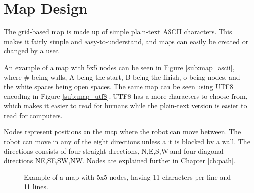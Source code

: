 \newpage

\section{Map Design}
\label{sec:map_design} %
The grid-based map is made up of simple plain-text ASCII characters.
This makes it fairly simple and easy-to-understand, and maps can easily be created or changed by a user. 

An example of a map with 5x5 nodes can be seen in Figure \ref{sub:map_ascii}, where \# being walls, A being the start, B being the finish, o being nodes, and the white spaces being open spaces. The same map can be seen using UTF8 encoding in Figure \ref{sub:map_utf8}. UTF8 has a more characters to choose from, which makes it easier to read for humans while the plain-text version is easier to read for computers.

Nodes represent positions on the map where the robot can move between. The robot can move in any of the eight directions unless a it is blocked by a wall. The directions consists of four straight directions, N,E,S,W and four diagonal directions NE,SE,SW,NW. Nodes are explained further in Chapter \ref{ch:path}. 

\begin{figure}[htp]
    \centering
    \hspace{0.2\textwidth}
    \caption{Example of a map with 5x5 nodes, having 11 characters per line and 11 lines.}
    \label{fig:5x5map}
\end{figure}

